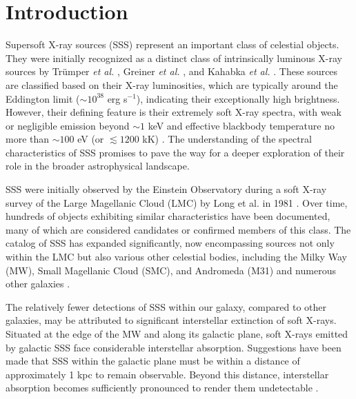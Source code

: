 \section{Introduction}
    
    Supersoft X-ray sources (SSS) represent an important class of celestial objects. They were initially recognized as a distinct class of intrinsically luminous X-ray sources by Trümper \textit{et al.} \cite{trumper1991x}, Greiner \textit{et al.} \cite{greiner1991rosat}, and Kahabka \textit{et al.} \cite{kahabka97}. These sources are classified based on their X-ray luminosities, which are typically around the Eddington limit ($\sim 10^{38}$ erg s$^{-1}$), indicating their exceptionally high brightness. However, their defining feature is their extremely soft X-ray spectra, with weak or negligible emission beyond $\sim 1$ keV and effective blackbody temperature no more than $\sim 100$ eV (or $\lesssim 1200$ kK) \cite{kahabka06}. The understanding of the spectral characteristics of SSS promises to pave the way for a deeper exploration of their role in the broader astrophysical landscape.
    
    SSS were initially observed by the Einstein Observatory during a soft X-ray survey of the Large Magellanic Cloud (LMC) by Long et al. in 1981 \cite{long81}. Over time, hundreds of objects exhibiting similar characteristics have been documented, many of which are considered candidates or confirmed members of this class. The catalog of SSS has expanded significantly, now encompassing sources not only within the LMC but also various other celestial bodies, including the Milky Way (MW), Small Magellanic Cloud (SMC), and Andromeda (M31) and numerous other galaxies \cite{kahabkatrumper1996,steinerdiaz1998,greiner2000,pietsch2003deep,di2003luminous,orio2010census,henze2010recent,sturm2012new,galiullin2021populations}.
    
    The relatively fewer detections of SSS within our galaxy, compared to other galaxies, may be attributed to significant interstellar extinction of soft X-rays. Situated at the edge of the MW and along its galactic plane, soft X-rays emitted by galactic SSS face considerable interstellar absorption. Suggestions have been made that SSS within the galactic plane must be within a distance of approximately 1 kpc to remain observable. Beyond this distance, interstellar absorption becomes sufficiently pronounced to render them undetectable \cite{van1992accreting}.
    
